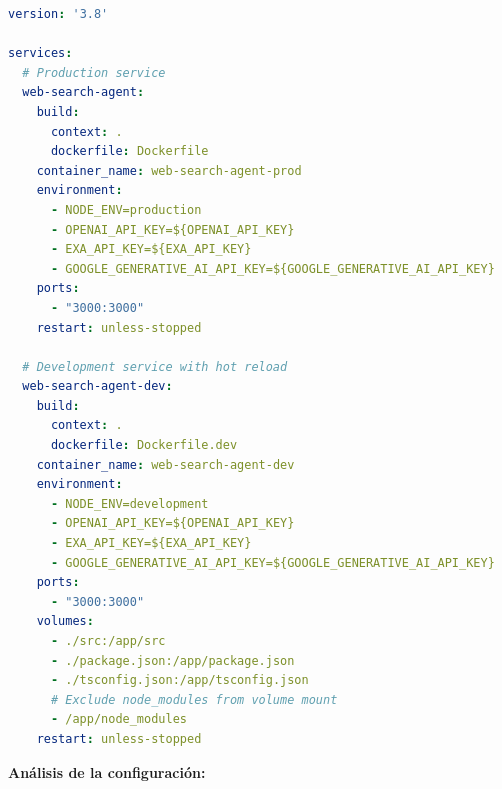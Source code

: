 \documentclass[12pt,a4paper]{article}
\begin{document}
\begin{lstlisting}[language=yaml, caption=docker-compose.yml - Configuración de Servicios]
version: '3.8'

services:
  # Production service
  web-search-agent:
    build:
      context: .
      dockerfile: Dockerfile
    container_name: web-search-agent-prod
    environment:
      - NODE_ENV=production
      - OPENAI_API_KEY=${OPENAI_API_KEY}
      - EXA_API_KEY=${EXA_API_KEY}
      - GOOGLE_GENERATIVE_AI_API_KEY=${GOOGLE_GENERATIVE_AI_API_KEY}
    ports:
      - "3000:3000"
    restart: unless-stopped

  # Development service with hot reload
  web-search-agent-dev:
    build:
      context: .
      dockerfile: Dockerfile.dev
    container_name: web-search-agent-dev
    environment:
      - NODE_ENV=development
      - OPENAI_API_KEY=${OPENAI_API_KEY}
      - EXA_API_KEY=${EXA_API_KEY}
      - GOOGLE_GENERATIVE_AI_API_KEY=${GOOGLE_GENERATIVE_AI_API_KEY}
    ports:
      - "3000:3000"
    volumes:
      - ./src:/app/src
      - ./package.json:/app/package.json
      - ./tsconfig.json:/app/tsconfig.json
      # Exclude node_modules from volume mount
      - /app/node_modules
    restart: unless-stopped
\end{lstlisting}

\textbf{Análisis de la configuración:}
\end{document}
